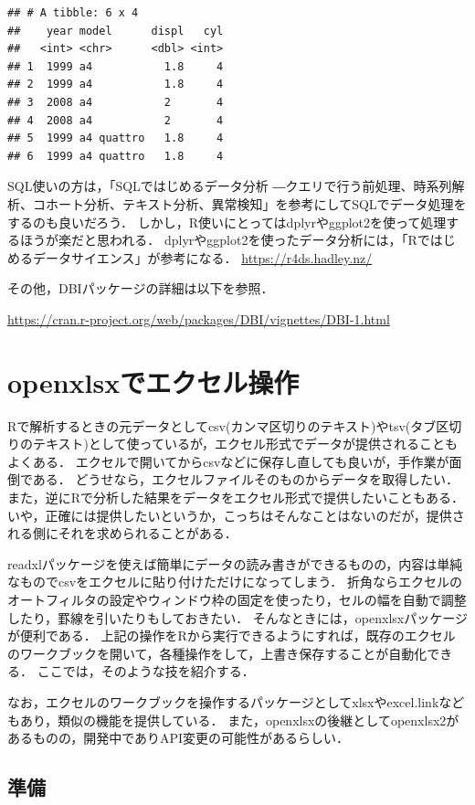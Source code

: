 \documentclass[
]{article}
\begin{document}
\begin{verbatim}
## # A tibble: 6 x 4
##    year model      displ   cyl
##   <int> <chr>      <dbl> <int>
## 1  1999 a4           1.8     4
## 2  1999 a4           1.8     4
## 3  2008 a4           2       4
## 4  2008 a4           2       4
## 5  1999 a4 quattro   1.8     4
## 6  1999 a4 quattro   1.8     4
\end{verbatim}

SQL使いの方は，「SQLではじめるデータ分析 ―クエリで行う前処理、時系列解析、コホート分析、テキスト分析、異常検知」を参考にしてSQLでデータ処理をするのも良いだろう．
しかし，R使いにとってはdplyrやggplot2を使って処理するほうが楽だと思われる．
dplyrやggplot2を使ったデータ分析には，「Rではじめるデータサイエンス」が参考になる．
\url{https://r4ds.hadley.nz/}

その他，DBIパッケージの詳細は以下を参照．

\url{https://cran.r-project.org/web/packages/DBI/vignettes/DBI-1.html}

\hypertarget{openxlsx}{%
\section{openxlsxでエクセル操作}\label{openxlsx}}

Rで解析するときの元データとしてcsv(カンマ区切りのテキスト)やtsv(タブ区切りのテキスト)として使っているが，エクセル形式でデータが提供されることもよくある．
エクセルで開いてからcsvなどに保存し直しても良いが，手作業が面倒である．
どうせなら，エクセルファイルそのものからデータを取得したい．
また，逆にRで分析した結果をデータをエクセル形式で提供したいこともある．
いや，正確には提供したいというか，こっちはそんなことはないのだが，提供される側にそれを求められることがある．

readxlパッケージを使えば簡単にデータの読み書きができるものの，内容は単純なものでcsvをエクセルに貼り付けただけになってしまう．
折角ならエクセルのオートフィルタの設定やウィンドウ枠の固定を使ったり，セルの幅を自動で調整したり，罫線を引いたりもしておきたい．
そんなときには，openxlsxパッケージが便利である．
上記の操作をRから実行できるようにすれば，既存のエクセルのワークブックを開いて，各種操作をして，上書き保存することが自動化できる．
ここでは，そのような技を紹介する．

なお，エクセルのワークブックを操作するパッケージとしてxlsxやexcel.linkなどもあり，類似の機能を提供している．
また，openxlsxの後継としてopenxlsx2があるものの，開発中でありAPI変更の可能性があるらしい．

\hypertarget{ux6e96ux5099-13}{%
\subsection{準備}\label{ux6e96ux5099-13}}
\end{document}
